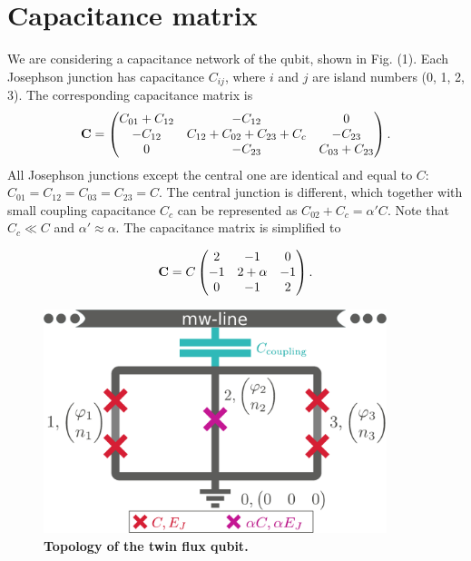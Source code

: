 \documentclass[%
superscriptaddress,
preprint,
preprintnumbers,
bibnotes,
amsmath,
amssymb,
aps,
showkeys,
prb,
]{revtex4-1}
\begin{document}

\section{Capacitance matrix}
\label{sec:capacitance-matrix}

We are considering a capacitance network of the qubit, shown in Fig. (1). Each Josephson junction has capacitance $C_{ij}$, where $i$ and $j$ are island numbers (0, 1, 2, 3). The corresponding capacitance matrix is
  \begin{equation}
\bold{C} =  \begin{pmatrix}
      C_{01} + C_{12}& -C_{12} & 0\\
      -C_{12} & C_{12} + C_{02} + C_{23} + C_c & -C_{23}\\
      0 & -C_{23} & C_{03} + C_{23}
    \end{pmatrix}
    .
  \end{equation}
All Josephson junctions except the central one are identical and equal to $C$: $C_{01} = C_{12} = C_{03} = C_{23} = C$. The central junction is different, which together with small coupling capacitance $C_c$ can be represented as $C_{02} + C_c = \alpha' C$. Note that $C_c \ll C$ and $\alpha' \approx \alpha$.    
The capacitance matrix is simplified to 
\begin{framed}\noindent
  \begin{equation}
\bold{C} =  C \begin{pmatrix}
      2 & -1 & 0\\
      -1 & 2 + \alpha & -1\\
      0 & -1 & 2
    \end{pmatrix}
    .
  \end{equation}

\end{framed}

\begin{figure}[ht]
  \centering
  \includegraphics[width=100mm]{fig1_supp}
  \caption{\textbf{Topology of the twin flux qubit.}\label{fig:supp1}}
\end{figure}
\end{document}
